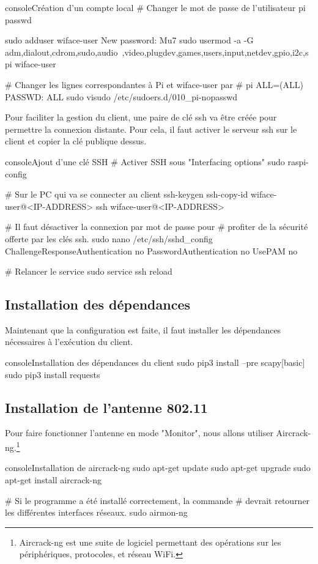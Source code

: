 \begin{listingsbox}{console}{Création d'un compte local}
# Changer le mot de passe de l'utilisateur pi
passwd

sudo adduser wiface-user
New password: Mu7%
sudo usermod -a -G adm,dialout,cdrom,sudo,audio\
,video,plugdev,games,users,input,netdev,gpio,i2c,spi wiface-user

# Changer les lignes correspondantes à Pi et wiface-user par 
# pi ALL=(ALL) PASSWD: ALL
sudo visudo /etc/sudoers.d/010_pi-nopasswd
\end{listingsbox}

Pour faciliter la gestion du client, une paire de clé ssh va être créée pour permettre la connexion distante.
Pour cela, il faut activer le serveur ssh sur le client et copier la clé publique dessus.

\begin{listingsbox}{console}{Ajout d'une clé SSH}
    # Activer SSH sous "Interfacing options"
    sudo raspi-config

    # Sur le PC qui va se connecter au client
    ssh-keygen
    ssh-copy-id wiface-user@<IP-ADDRESS>
    ssh wiface-user@<IP-ADDRESS>

    # Il faut désactiver la connexion par mot de passe pour
    # profiter de la sécurité offerte par les clés ssh.
    sudo nano /etc/ssh/sshd_config
    ChallengeResponseAuthentication no
    PasswordAuthentication no
    UsePAM no

    # Relancer le service
    sudo service ssh reload
\end{listingsbox}

\subsection{Installation des dépendances}
Maintenant que la configuration est faite, il faut installer les dépendances
nécessaires à l'exécution du client. 

\begin{listingsbox}{console}{Installation des dépendances du client}
    sudo pip3 install --pre scapy[basic]
    sudo pip3 install requests
\end{listingsbox}


\subsection{Installation de l'antenne 802.11}
Pour faire fonctionner l'antenne en mode "Monitor", nous allons utiliser Aircrack-ng.\footnote{Aircrack-ng est une suite de logiciel permettant des opérations sur les périphériques, protocoles, et réseau WiFi.}
\begin{listingsbox}{console}{Installation de aircrack-ng}
sudo apt-get update
sudo apt-get upgrade
sudo apt-get install aircrack-ng

# Si le programme a été installé correctement, la commande
# devrait retourner les différentes interfaces réseaux.
sudo airmon-ng
\end{listingsbox}

